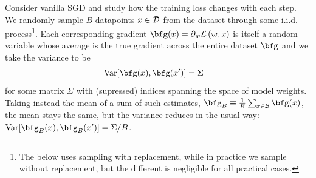 \documentclass[11pt]{article}
\begin{document}
Consider vanilla SGD and study how the training loss changes with each step.  We randomly sample $ B
$ datapoints $ x \in \mathcal{D}$ from the dataset through some i.i.d. process\footnote{The below uses
sampling with replacement, while in practice we sample without replacement, but the different is
negligible for all practical cases.}. Each corresponding gradient $ \bfg (x) = \partial _{ w} \Lcal
\left ( w, x \right ) $ is itself a random variable whose average is the true gradient across the
entire dataset $ \bar{\bfg} $ and we take the variance to be
\begin{align}
    {\rm Var}[\bfg (x), \bfg (x')]&=\Sigma
\end{align}
for some matrix $ \Sigma  $ with (supressed) indices spanning the space of model weights. Taking instead the mean
of a sum of such estimates, $ \bfg _{ B }\equiv \frac{ 1 }{ B } \sum _{ x \in \Bcal} \bfg (x) $,
the mean stays the same, but the variance reduces in the usual way: $ {\rm Var}[\bfg _{ B } (x),
\bfg _{ B }(x')]=\Sigma /B$.
\end{document}
